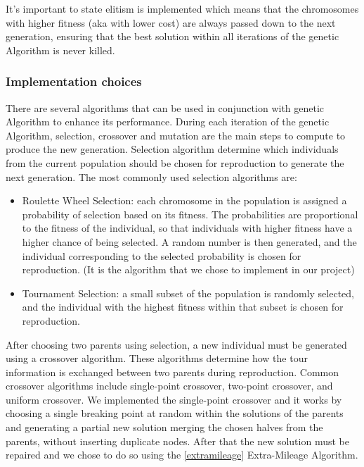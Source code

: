 It's important to state elitism is implemented which means that the chromosomes with higher fitness (aka with lower cost) are always passed down to the next generation, ensuring that the best solution within all iterations of the genetic Algorithm is never killed. 

\subsubsection{Implementation choices}
There are several algorithms that can be used in conjunction with genetic Algorithm to enhance its performance.
During each iteration of the genetic Algorithm, selection, crossover and mutation are the main steps to compute to produce the new generation.
Selection algorithm determine which individuals from the current population should be chosen for reproduction to generate the next generation. The most commonly used selection algorithms are:

\begin{itemize}
    \item Roulette Wheel Selection: each chromosome in the population is assigned a probability of selection based on its fitness. The probabilities are proportional to the fitness of the individual, so that individuals with higher fitness have a higher chance of being selected. A random number is then generated, and the individual corresponding to the selected probability is chosen for reproduction. (It is the algorithm that we chose to implement in our project)
    \item Tournament Selection: a small subset of the population is randomly selected, and the individual with the highest fitness within that subset is chosen for reproduction.
\end{itemize}

After choosing two parents using selection, a new individual must be generated using a crossover algorithm. 
These algorithms determine how the tour information is exchanged between two parents during reproduction. Common crossover algorithms include single-point crossover, two-point crossover, and uniform crossover.
We implemented the single-point crossover and it works by choosing a single breaking point at random within the solutions of the parents and generating a partial new solution merging the chosen halves from the parents, without inserting duplicate nodes.
After that the new solution must be repaired and we chose to do so using the \ref{extramileage} Extra-Mileage Algorithm.

